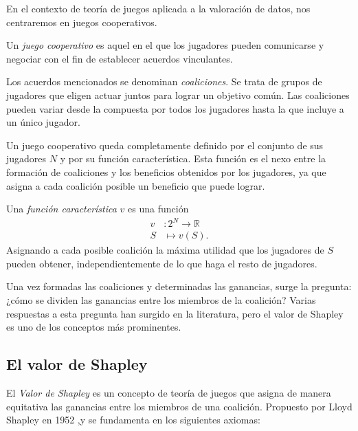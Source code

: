 En el contexto de teoría de juegos aplicada a la valoración de datos,
nos centraremos en juegos cooperativos.

\begin{definition}
  Un \emph{juego cooperativo} es aquel en el que los jugadores
  pueden comunicarse y negociar con el fin de establecer acuerdos
  vinculantes.
\end{definition}

Los acuerdos mencionados se denominan \emph{coaliciones}.
Se trata de grupos de jugadores que eligen actuar juntos para
lograr un objetivo común. Las coaliciones pueden
variar desde la compuesta por todos los jugadores hasta la que
incluye a un único jugador.


Un juego cooperativo queda completamente definido por el conjunto
de sus jugadores $N$ y por su función característica. Esta función
es el nexo entre la formación de coaliciones y los beneficios
obtenidos por los jugadores, ya que asigna a cada coalición posible
un beneficio que puede lograr.

\begin{definition}
  Una \emph{función característica} $v$ es una función
  \begin{align*}
    v&:2^N \longrightarrow \mathbb{R}\\
    S&\longmapsto v(S).
  \end{align*}
  Asignando a cada posible coalición la máxima
  utilidad que los jugadores de $S$ pueden obtener,
  independientemente de lo que haga el resto de
  jugadores.
\end{definition}


Una vez formadas las coaliciones y determinadas las ganancias,
surge la pregunta: ¿cómo se dividen las ganancias entre los
miembros de la coalición? Varias respuestas a esta pregunta
han surgido en la literatura, pero el valor de
Shapley es uno de los conceptos más prominentes.

\subsection{El valor de Shapley}

El \emph{Valor de Shapley} es un concepto de teoría de juegos
que asigna de manera equitativa las ganancias
entre los miembros de una coalición. Propuesto
por Lloyd Shapley en 1952 \cite{shapleyValue},y 
se fundamenta en los siguientes axiomas:

